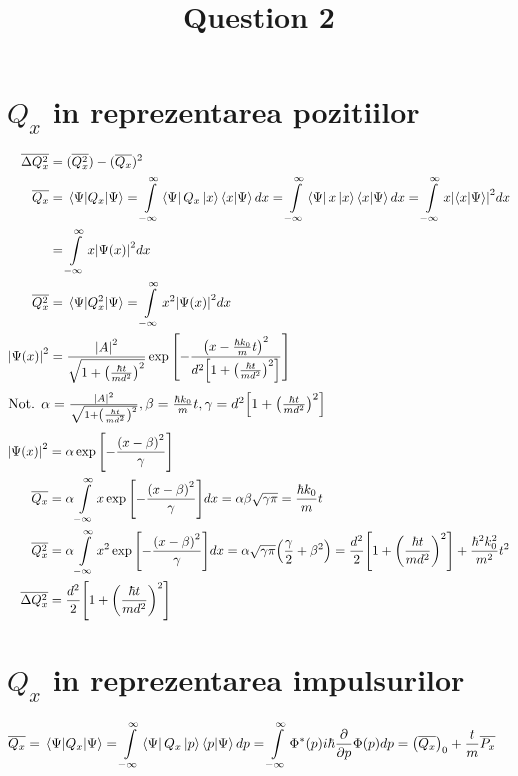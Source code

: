 \documentclass[11pt]{article} %
\title{Question 2}
\date{} %
\newcommand*\mean[1]{\overline{#1}}
\newcommand{\integral}{\int\limits_{-\infty}^{\infty}}
\begin{document}
\maketitle

\section{\(Q_x\) in reprezentarea pozitiilor}
\label{sec:Qx-x}

\begin{align*}
  \mean{\Delta Q_x^2} &= (\mean{Q_x^2}) - (\mean{Q_x})^2 \\
  \mean{Q_x} &= \expval{Q_x}{\Psi} =
    \integral \bra{\Psi}Q_x\ket{x}\braket{x}{\Psi}dx =
    \integral \bra{\Psi}x\ket{x}\braket{x}{\Psi}dx =
    \integral x \abs{\braket{x}{\Psi}}^2 dx \\ &=
    \integral x \abs{\Psi(x)}^2 dx \\
  \mean{Q_x^2} &= \expval{Q_x^2}{\Psi} =
    \integral x^2 \abs{\Psi(x)}^2 dx \\
  \abs{\Psi(x)}^2 &= \frac{\abs{A}^2}{\sqrt{1+\qty(\frac{\hbar t}{m d^2})^2}}
    \exp\qty[- \frac{\qty(x - \frac{\hbar k_0}{m} t)^2}{d^2 \qty[1 + \qty(\frac{\hbar t}{m d^2})^2]}] \\
\end{align*}
\(
  \text{Not. } \alpha = \frac{\abs{A}^2}{\sqrt{1+\qty(\frac{\hbar t}{m d^2})^2}},
    \beta = \frac{\hbar k_0}{m} t, \gamma = d^2 \qty[1 + \qty(\frac{\hbar t}{m d^2})^2]
\)
\begin{align*}
  \abs{\Psi(x)}^2 &= \alpha \exp\qty[- \frac{\qty(x-\beta)^2}{\gamma}] \\
  \mean{Q_x} &= \alpha \integral x \exp\qty[- \frac{\qty(x-\beta)^2}{\gamma}] dx
    = \alpha \beta \sqrt{\gamma \pi} = \frac{\hbar k_0}{m} t \\
  \mean{Q_x^2} &= \alpha \integral x^2 \exp\qty[- \frac{\qty(x-\beta)^2}{\gamma}] dx
    = \alpha \sqrt{\gamma \pi} \qty(\frac{\gamma}{2} + \beta^2)
    = \frac{d^2}{2}\qty[1 + \qty(\frac{\hbar t}{m d^2})^2] + \frac{\hbar^2 k_0^2}{m^2} t^2 \\
  \mean{\Delta Q_x^2} &= \frac{d^2}{2}\qty[1 + \qty(\frac{\hbar t}{m d^2})^2] 
\end{align*}

\section{\(Q_x\) in reprezentarea impulsurilor}
\label{sec:Qx-p}

\begin{align*}
  \mean{Q_x} &= \expval{Q_x}{\Psi} =
    \integral \bra{\Psi}Q_x\ket{p}\braket{p}{\Psi}dp =
    \integral \Phi^*(p) i \hbar \pdv{p} \Phi(p) dp =
    \qty(\mean{Q_x})_0 + \frac{t}{m}\mean{P_x}
\end{align*}
\end{document}
